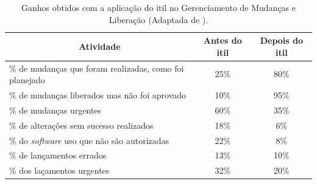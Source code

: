 \begin{table}[H]
\centering
\small
\begin{tabular}{|l|c|c|}
\hline
\multicolumn{1}{|c|}{Atividade}                         & Antes do \acrshort{itil} & Depois do \acrshort{itil} \\ \hline
\% de mudanças que foram realizadas, como foi planejado & 25\%          & 80\%           \\ \hline
\% de mudanças liberados mas não foi aprovado           & 10\%          & 95\%           \\ \hline
\% de mudanças urgentes                                 & 60\%          & 35\%           \\ \hline
\% de alterações sem sucesso realizados                 & 18\%          & 6\%            \\ \hline
\% do \textit{software} uso que não são autorizadas              & 22\%          & 8\%            \\ \hline
\% de lançamentos errados                               & 13\%          & 10\%           \\ \hline
\% dos laçamentos urgentes                              & 32\%          & 20\%           \\ \hline
\end{tabular}
\caption{Ganhos obtidos com a aplicação do \acrshort{itil} no Gerenciamento de Mudanças e Liberação (Adaptada de \cite{spremic2008and}).}
\label{tbI_itil3}
\end{table}